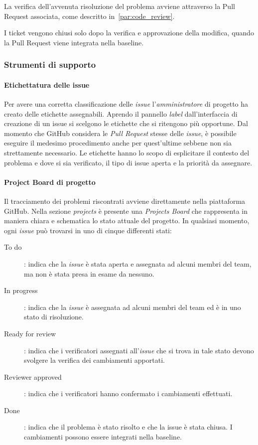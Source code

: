 \documentclass[../../norme-di-progetto.tex]{subfiles}
\begin{document}
La verifica dell'avvenuta risoluzione del problema avviene attraverso la Pull Request associata, come descritto in~\ref{par:code_review}.

I ticket vengono chiusi solo dopo la verifica e approvazione della modifica, quando la Pull Request viene integrata nella baseline.


\subsubsection{Strumenti di supporto}%
\label{subs:risoluzione_dei_problemi/strumenti_di_supporto}

\paragraph{Etichettatura delle issue}%
\label{par:etichettatura_delle_issue}

Per avere una corretta classificazione delle \textit{issue} l'\textit{amministratore} di progetto ha creato delle etichette assegnabili.
Aprendo il pannello \textit{label} dall'interfaccia di creazione di un issue si scelgono le etichette che si ritengono più opportune. Dal momento che GitHub considera le \textit{Pull Request} stesse delle \textit{issue}, è possibile eseguire il medesimo procedimento anche per quest'ultime sebbene non sia strettamente necessario.
Le etichette hanno lo scopo di esplicitare il contesto del problema e dove si sia verificato, il tipo di issue aperta e la priorità da assegnare.

\paragraph{Project Board di progetto}%
\label{par:risoluzione_dei_problemi/project_board_di_progetto}

Il tracciamento dei problemi riscontrati avviene direttamente nella piattaforma GitHub.
Nella sezione \textit{projects} è presente una \textit{Projects Board} che rappresenta in maniera chiara e schematica lo stato attuale del progetto.
In qualsiasi momento, ogni \textit{issue} può trovarsi in uno di cinque differenti stati:
\begin{description}
  \item [To do]: indica che la \textit{issue} è stata aperta e assegnata ad alcuni membri del team, ma non è stata presa in esame da nessuno.
  \item [In progress]: indica che la \textit{issue} è assegnata ad alcuni membri del team ed è in uno stato di risoluzione.
  \item [Ready for review]: indica che i verificatori assegnati all'\textit{issue} che si trova in tale stato devono svolgere la verifica dei cambiamenti apportati.
  \item [Reviewer approved]: indica che i verificatori hanno confermato i cambiamenti effettuati.
  \item [Done]: indica che il problema è stato risolto e che la issue è stata chiusa. I cambiamenti possono essere integrati nella baseline.
\end{description}
\end{document}
